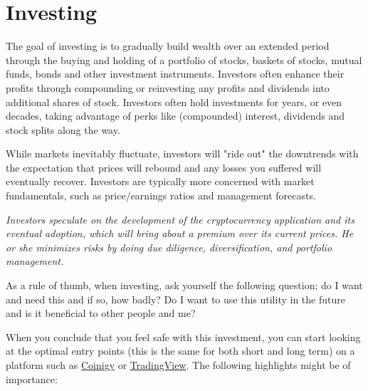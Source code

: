 \section{Investing}
The goal of investing is to gradually build wealth over an extended period through the buying and holding of a portfolio of stocks, baskets of stocks, mutual funds, bonds and other investment instruments. Investors often enhance their profits through compounding or reinvesting any profits and dividends into additional shares of stock. Investors often hold investments for years, or even decades, taking advantage of perks like (compounded) interest, dividends and stock splits along the way.\medskip

While markets inevitably fluctuate, investors will "ride out" the downtrends with the expectation that prices will rebound and any losses you suffered will eventually recover. Investors are typically more concerned with market fundamentals, such as price/earnings ratios and management forecasts.

    \medskip
    \begin{tcolorbox}
    [enhanced,
    title=Investors,
    frame style=
    {left color=orange!85!black,right color=yellow!95!black}]
            \textit{Investors speculate on the development of the cryptocurrency application and its eventual adoption, which will bring about a premium over its current prices. He or she minimizes risks by doing due diligence, diversification, and portfolio management.}
    \end{tcolorbox}
    \medskip

\noindent As a rule of thumb, when investing, ask yourself the following question; do I want and need this and if so, how badly? Do I want to use this utility in the future and is it beneficial to other people and me?\medskip

When you conclude that you feel safe with this investment, you can start looking at the optimal entry points (this is the same for both short and long term) on a platform such as \href{https://www.coinigy.com/?r=17fa0d35}{Coinigy} or \href{https://www.tradingview.com/}{TradingView}. The following highlights might be of importance:\medskip  


